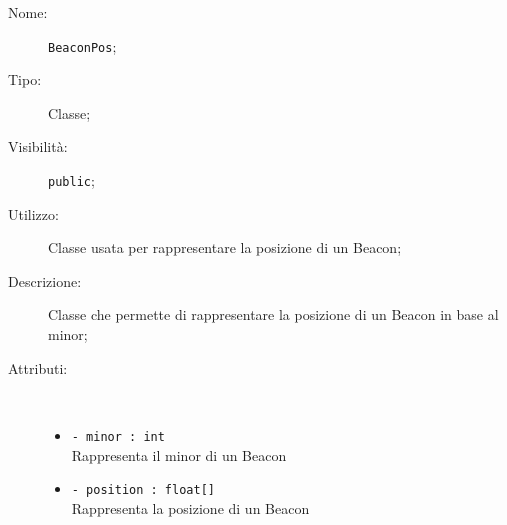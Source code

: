 \documentclass[../DefinizioneDiProdotto.tex]{subfiles}
\begin{document}
\begin{description}
	\item[Nome:] \texttt{BeaconPos};
	\item[Tipo:] Classe;
	\item[Visibilità:] \texttt{public};
	\item[Utilizzo:] Classe usata per rappresentare la posizione di un Beacon;
	\item[Descrizione:] Classe che permette di rappresentare la posizione di un Beacon in base al minor;
	\item[Attributi:] \
	\begin{itemize}
		\item \texttt{- minor : int}\\
		Rappresenta il minor di un Beacon
		
		\item \texttt{- position : float[]}\\
		Rappresenta la posizione di un Beacon
		

\end{itemize}
\end{description}
\end{document}
